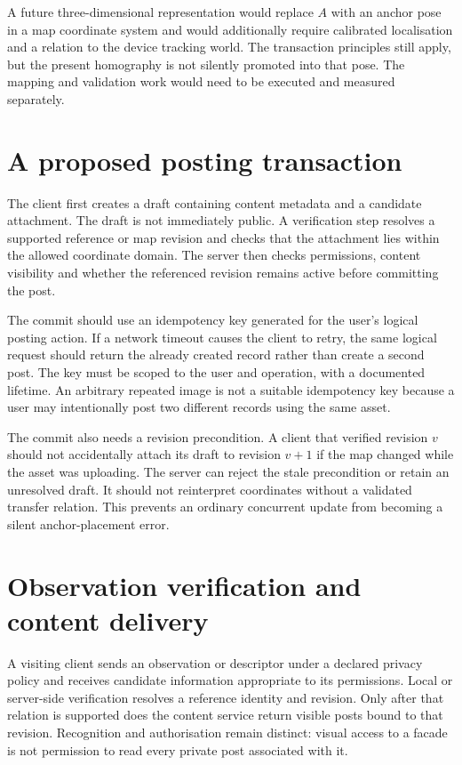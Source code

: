 A future three-dimensional representation would replace $A$ with an anchor pose in a map coordinate system and would additionally require calibrated localisation and a relation to the device tracking world. The transaction principles still apply, but the present homography is not silently promoted into that pose. The mapping and validation work would need to be executed and measured separately.

\section{A proposed posting transaction}
The client first creates a draft containing content metadata and a candidate attachment. The draft is not immediately public. A verification step resolves a supported reference or map revision and checks that the attachment lies within the allowed coordinate domain. The server then checks permissions, content visibility and whether the referenced revision remains active before committing the post.

The commit should use an idempotency key generated for the user's logical posting action. If a network timeout causes the client to retry, the same logical request should return the already created record rather than create a second post. The key must be scoped to the user and operation, with a documented lifetime. An arbitrary repeated image is not a suitable idempotency key because a user may intentionally post two different records using the same asset.

The commit also needs a revision precondition. A client that verified revision $v$ should not accidentally attach its draft to revision $v+1$ if the map changed while the asset was uploading. The server can reject the stale precondition or retain an unresolved draft. It should not reinterpret coordinates without a validated transfer relation. This prevents an ordinary concurrent update from becoming a silent anchor-placement error.

\section{Observation verification and content delivery}
A visiting client sends an observation or descriptor under a declared privacy policy and receives candidate information appropriate to its permissions. Local or server-side verification resolves a reference identity and revision. Only after that relation is supported does the content service return visible posts bound to that revision. Recognition and authorisation remain distinct: visual access to a facade is not permission to read every private post associated with it.

